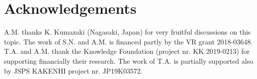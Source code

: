 \documentclass{article}
\begin{document}
\section*{Acknowledgements} A.M. thanks K. Kumazaki (Nagasaki, Japan) for very fruitful discussions on this topic. The work of S.N.  and A.M. is financed partly by the VR grant 2018-03648. T.A. and A.M. thank the Knowledge Foundation (project nr. KK 2019-0213) for supporting financially their research. The work of T.A. is partially supported also by JSPS KAKENHI project nr. JP19K03572.


\begin{center}
	
	
\end{center} 
\end{document}
